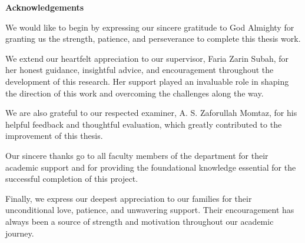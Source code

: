 \newpage
\thispagestyle{plain}
    \begin{center}
    
        \vspace*{0.1cm}
        \Large
        \textbf{Acknowledgements}\\
        \vspace{0.5cm}
        
    \end{center}


We would like to begin by expressing our sincere gratitude to God Almighty for granting us the strength, patience, and perseverance to complete this thesis work.

We extend our heartfelt appreciation to our supervisor, Faria Zarin Subah, for her honest guidance, insightful advice, and encouragement throughout the development of this research. Her support played an invaluable role in shaping the direction of this work and overcoming the challenges along the way.

We are also grateful to our respected examiner, A. S. Zaforullah Momtaz, for his helpful feedback and thoughtful evaluation, which greatly contributed to the improvement of this thesis.

Our sincere thanks go to all faculty members of the department for their academic support and for providing the foundational knowledge essential for the successful completion of this project.

Finally, we express our deepest appreciation to our families for their unconditional love, patience, and unwavering support. Their encouragement has always been a source of strength and motivation throughout our academic journey.